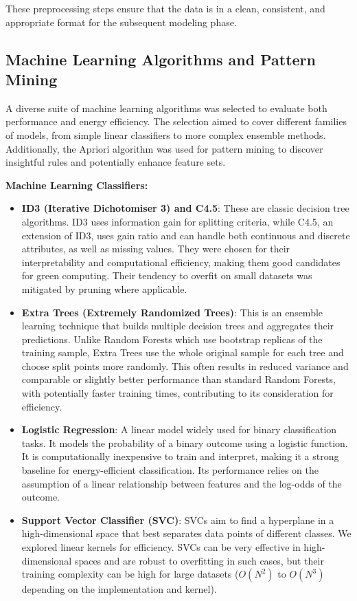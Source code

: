 \documentclass[conference]{IEEEtran}
\begin{document}
These preprocessing steps ensure that the data is in a clean, consistent, and appropriate format for the subsequent modeling phase.

\subsection{Machine Learning Algorithms and Pattern Mining}
A diverse suite of machine learning algorithms was selected to evaluate both performance and energy efficiency. The selection aimed to cover different families of models, from simple linear classifiers to more complex ensemble methods. Additionally, the Apriori algorithm was used for pattern mining to discover insightful rules and potentially enhance feature sets.

\textbf{Machine Learning Classifiers:}
\begin{itemize}
    \item \textbf{ID3 (Iterative Dichotomiser 3) and C4.5}: These are classic decision tree algorithms. ID3 uses information gain for splitting criteria, while C4.5, an extension of ID3, uses gain ratio and can handle both continuous and discrete attributes, as well as missing values. They were chosen for their interpretability and computational efficiency, making them good candidates for green computing. Their tendency to overfit on small datasets was mitigated by pruning where applicable.
    \item \textbf{Extra Trees (Extremely Randomized Trees)}: This is an ensemble learning technique that builds multiple decision trees and aggregates their predictions. Unlike Random Forests which use bootstrap replicas of the training sample, Extra Trees use the whole original sample for each tree and choose split points more randomly. This often results in reduced variance and comparable or slightly better performance than standard Random Forests, with potentially faster training times, contributing to its consideration for efficiency.
    \item \textbf{Logistic Regression}: A linear model widely used for binary classification tasks. It models the probability of a binary outcome using a logistic function. It is computationally inexpensive to train and interpret, making it a strong baseline for energy-efficient classification. Its performance relies on the assumption of a linear relationship between features and the log-odds of the outcome.
    \item \textbf{Support Vector Classifier (SVC)}: SVCs aim to find a hyperplane in a high-dimensional space that best separates data points of different classes. We explored linear kernels for efficiency. SVCs can be very effective in high-dimensional spaces and are robust to overfitting in such cases, but their training complexity can be high for large datasets ($O(N^2)$ to $O(N^3)$ depending on the implementation and kernel).

\end{itemize}
\end{document}
